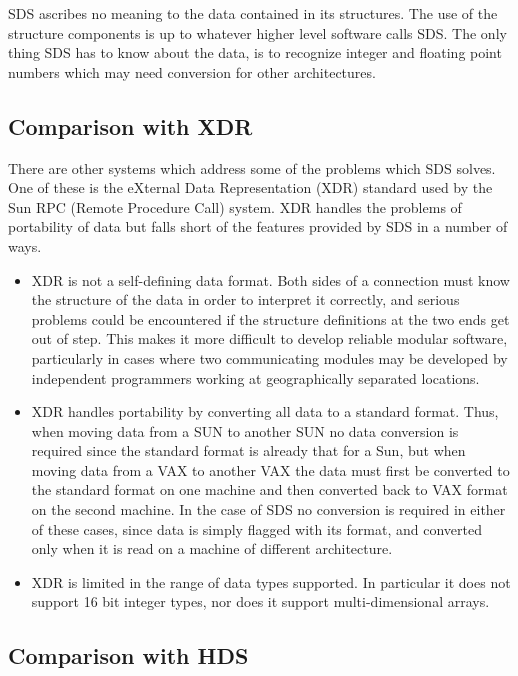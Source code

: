 SDS ascribes no meaning to the data contained in its structures. The use of 
the structure components is up to whatever higher level software calls SDS.
The only thing SDS has to know about the data, is to recognize integer and
floating point numbers which may need conversion for other architectures.

\subsection{Comparison with XDR}

There are other systems which address some of the problems which SDS solves.
One of these is the eXternal Data Representation (XDR) standard used by 
the Sun RPC (Remote Procedure Call) system. XDR handles the problems of
portability of data but falls short of the features provided by SDS in a number
of ways.

\begin{itemize}

\item XDR is not a self-defining data format. Both sides of a connection must
know the structure of the data in order to interpret it correctly, and serious
problems could be encountered if the structure definitions at the two ends get
out of step. This makes it more difficult to develop reliable modular software,
particularly in cases where two communicating modules may be developed by
independent programmers working at geographically separated locations.

\item XDR handles portability by converting all data to a standard format.
Thus, when moving data from a SUN to another SUN no data conversion is required
since the standard format is already that for a Sun, but when moving data from
a VAX to another VAX the data must first be converted to the standard format on
one machine and then converted back to VAX format on the second machine. In the
case of SDS no conversion is required in either of these cases, since data is
simply flagged with its format, and converted only when it is read on a machine
of different architecture.

\item XDR is limited in the range of data types supported. In particular it
does not support 16 bit integer types, nor does it support multi-dimensional
arrays.

\end{itemize}

\subsection{Comparison with HDS}


